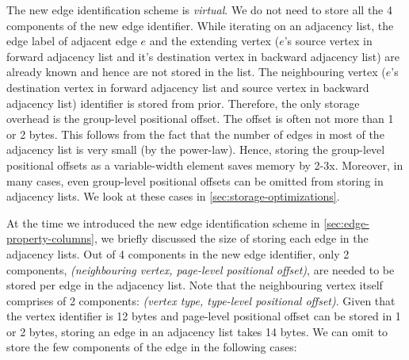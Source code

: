 The new edge identification scheme is \emph{virtual}. We do not need to store all the 4 components of the new edge identifier. While iterating on an adjacency list, the edge label of adjacent edge $e$ and the extending vertex ($e$'s source vertex in forward adjacency list and it's destination vertex in backward adjacency list) are already known and hence are not stored in the list. The neighbouring vertex ($e$'s destination vertex in forward adjacency list and source vertex in backward adjacency list) identifier is stored from prior. Therefore, the only storage overhead is the group-level positional offset. The offset is often not more than 1 or 2 bytes. This follows from the fact that the number of edges in most of the adjacency list is very small (by the power-law). Hence, storing the group-level positional offsets as a variable-width element saves memory by 2-3x. Moreover, in many cases, even group-level positional offsets can be omitted from storing in adjacency lists. We look at these cases in \ref{sec:storage-optimizations}.

At the time we introduced the new edge identification scheme in \ref{sec:edge-property-columns}, we briefly discussed the size of storing each edge in the adjacency lists. Out of 4 components in the new edge identifier, only 2 components, \emph{(neighbouring vertex, page-level positional offset)}, are needed to be stored per edge in the adjacency list. Note that the neighbouring vertex itself comprises of 2 components: \emph{(vertex type, type-level positional offset)}. Given that the vertex identifier is 12 bytes and page-level positional offset can be stored in 1 or 2 bytes, storing an edge in an adjacency list takes 14 bytes. We can omit to store the few components of the edge in the following cases: 

